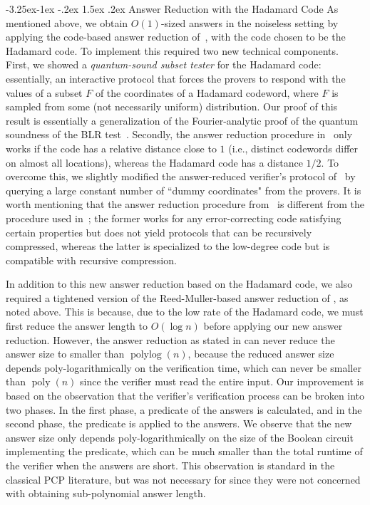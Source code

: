 \documentclass[11pt]{article}
\makeatletter
\renewcommand{\subsubsection}{\@startsection{subsubsection}{2}{\z@}%
             {-3.25ex\@plus -1ex \@minus -.2ex}%
             {1.5ex \@plus .2ex}%
             {\normalfont\normalsize\scshape\bfseries}}
\theoremstyle{plain}
\theoremstyle{definition}
\newcommand{\poly} {\ensuremath{\operatorname{poly}}}
\newcommand{\polylog} {\ensuremath{\operatorname{polylog}}}
\newcommand{\1}{\mathbb{1}} %
\makeatother
\begin{document}
\subsubsection{Answer Reduction with the Hadamard Code} 
As mentioned above, we obtain $O(1)$-sized answers in the noiseless setting by applying the code-based answer reduction of~\cite{neexp}, with the code chosen to be the Hadamard code. To implement this required two new technical components. First, we showed a \emph{quantum-sound subset tester} for the Hadamard code: essentially, an interactive protocol that forces the provers to respond with the values of a subset $F$ of the coordinates of a Hadamard codeword, where $F$ is sampled from some (not necessarily uniform) distribution. Our proof of this result is essentially a generalization of the Fourier-analytic proof of the quantum soundness of the BLR test~\cite{BLR,NV17}. Secondly, the answer reduction procedure in~\cite{neexp} only works if the code has a relative distance close to $1$ (i.e., distinct codewords differ on almost all locations), whereas the Hadamard code has a distance $1/2$. 
To overcome this, we slightly modified the answer-reduced verifier's protocol of~\cite{neexp} by querying a large constant number of ``dummy coordinates" from the provers. It is worth mentioning that the answer reduction procedure from~\cite{neexp} is different from the procedure used in~\cite{JNVWY'20}; the former works for any error-correcting code satisfying certain properties but does not yield protocols that can be recursively compressed, whereas the latter is specialized to the low-degree code but is compatible with recursive compression. 


In addition to this new answer reduction based on the Hadamard code, we also required a tightened version of the Reed-Muller-based answer reduction of \cite{JNVWY'20}, as noted above. This is because, due to the low rate of the Hadamard code, we must first reduce the answer length to $O(\log n)$ before applying our new answer reduction. However, the answer reduction as stated in \cite{JNVWY'20} can never reduce the answer size to smaller than $\polylog(n)$, because the reduced answer size depends poly-logarithmically on the verification time, which can never be smaller than $\poly(n)$ since the verifier must read the entire input. Our improvement is based on the observation that the verifier's verification process can be broken into two phases. In the first phase, a predicate of the answers is calculated, and in the second phase, the predicate is applied to the answers. We observe that the new answer size only depends poly-logarithmically on the size of the Boolean circuit implementing the predicate, which can be much smaller than the total runtime of the verifier when the answers are short. This observation is standard in the classical PCP literature, but was not necessary for \cite{JNVWY'20} since they were not concerned with obtaining sub-polynomial answer length.
\end{document}

